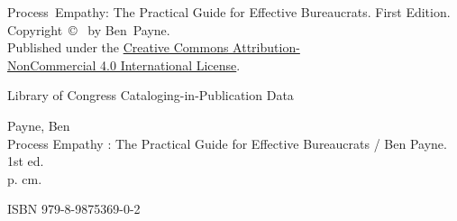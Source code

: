 \thispagestyle{empty}

\noindent Process~Empathy: The Practical Guide for Effective Bureaucrats. First Edition. \\Copyright~\copyright~\the\year{}
 by Ben~Payne. \\
Published under the \href{https://creativecommons.org/licenses/by-nc/4.0/}{Creative Commons Attribution-\\NonCommercial 4.0 International License}.



\vspace*{\fill}



\noindent Library of Congress Cataloging-in-Publication Data

\noindent Payne, Ben\\
Process Empathy : The Practical Guide for Effective Bureaucrats / Ben Payne. 1st ed.\\
p. cm.

\noindent ISBN 979-8-9875369-0-2
